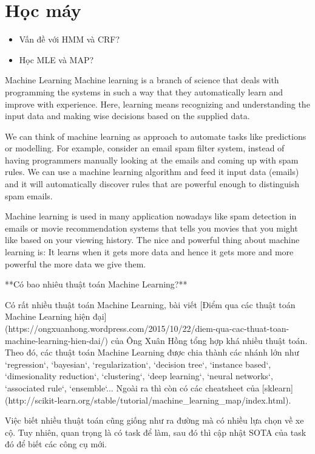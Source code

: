 \chapter{Học máy}

\begin{itemize}
  \item Vấn đề với HMM và CRF?
  \item Học MLE và MAP?
\end{itemize}


Machine Learning
Machine learning is a branch of science that deals with programming the systems in such a way that they automatically learn and improve with experience. Here, learning means recognizing and understanding the input data and making wise decisions based on the supplied data.

We can think of machine learning as approach to automate tasks like predictions or modelling. For example, consider an email spam filter system, instead of having programmers manually looking at the emails and coming up with spam rules. We can use a machine learning algorithm and feed it input data (emails) and it will automatically discover rules that are powerful enough to distinguish spam emails.

Machine learning is used in many application nowadays like spam detection in emails or movie recommendation systems that tells you movies that you might like based on your viewing history. The nice and powerful thing about machine learning is: It learns when it gets more data and hence it gets more and more powerful the more data we give them.

**Có bao nhiêu thuật toán Machine Learning?**

Có rất nhiều thuật toán Machine Learning, bài viết [Điểm qua các thuật toán Machine Learning hiện đại](https://ongxuanhong.wordpress.com/2015/10/22/diem-qua-cac-thuat-toan-machine-learning-hien-dai/) của Ông Xuân Hồng tổng hợp khá nhiều thuật toán. Theo đó, các thuật toán Machine Learning được chia thành các nhánh lớn như `regression`, `bayesian`, `regularization`, `decision tree`, `instance based`, `dimesionality reduction`, `clustering`, `deep learning`, `neural networks`, `associated rule`, `ensemble`... Ngoài ra thì còn có các cheatsheet của [sklearn](http://scikit-learn.org/stable/tutorial/machine_learning_map/index.html).

Việc biết nhiều thuật toán cũng giống như ra đường mà có nhiều lựa chọn về xe cộ. Tuy nhiên, quan trọng là có task để làm, sau đó thì cập nhật SOTA của task đó để biết các công cụ mới.

